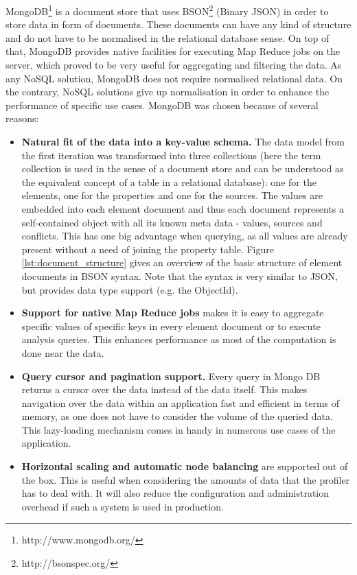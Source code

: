 MongoDB\footnote{http://www.mongodb.org/} is a document store that uses BSON\footnote{http://bsonspec.org/} (Binary JSON) in order to store data in form of documents. 
These documents can have any kind of structure and do not have to be normalised in the relational database sense.
On top of that, MongoDB provides native facilities for executing Map Reduce \cite{Dean:2008:MSD:1327452.1327492} jobs on the server, which proved to be very useful for aggregating and filtering the data. 
As any NoSQL solution, MongoDB does not require normalised relational data.
On the contrary, NoSQL solutions give up normalisation in order to enhance the performance of specific use cases. 
MongoDB was chosen because of several reasons:

\begin{itemize}
\item \textbf{Natural fit of the data into a key-value schema.}
The data model from the first iteration was transformed into three collections (here the term collection is used in the sense of a document store and can be understood as the equivalent concept of a table in a relational database): one for the elements, one for the properties and one for the sources.
The values are embedded into each element document and thus each document represents a self-contained object with all its known meta data - values, sources and conflicts.
This has one big advantage when querying, as all values are already present without a need of joining the property table. 
Figure \ref{lst:document_structure} gives an overview of the basic structure of element documents in BSON syntax. Note that the syntax is very similar to JSON, but provides data type support (e.g. the ObjectId).

\item \textbf{Support for native Map Reduce jobs} makes it is easy to aggregate specific values of specific keys in every element document or to execute analysis queries. This enhances performance as most of the computation is done near the data.

\item \textbf{Query cursor and pagination support.}
Every query in Mongo DB returns a cursor over the data instead of the data itself. This makes navigation over the data within an application fast and efficient in terms of memory, as one does not have to consider the volume of the queried data. This lazy-loading mechanism comes in handy in numerous use cases of the application.

\item \textbf{Horizontal scaling and automatic node balancing} are supported out of the box.
This is useful when considering the amounts of data that the profiler has to deal with. It will also reduce the configuration and administration overhead if such a system is used in production.
\end{itemize}


